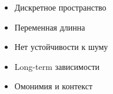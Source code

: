 \documentclass[10pt]{beamer}
\begin{document}
\begin{frame}
\begin{columns}[T]
\begin{column}[T]{0.5\textwidth}
\begin{center}
            \begin{itemize}
                \item Дискретное пространство
                \item Переменная длинна
                \item Нет устойчивости к шуму
                \item Long-term зависимости
                \item Омонимия и контекст
            \end{itemize}
        \end{center}
    \end{column}
\end{columns}

\end{frame}
\end{document}
